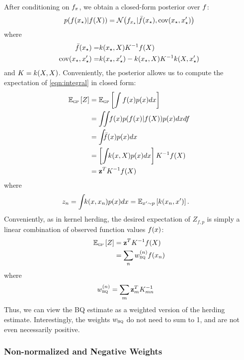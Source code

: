 \documentclass[]{article}
\begin{document}
After conditioning on ${f}_{{x}}$, we obtain a closed-form posterior over ${f}$:
%
\begin{align}
p({f}({x}_\star)|{f}({X})) = \mathcal{N}\!\left({f}_{{x}_\star}|\bar{{f}}({x}_\star),\operatorname{cov}({x}_\star,{x}_\star')\right)
\end{align} 
where
\begin{align}
\bar{{f}}({x}_\star) = & k({x}_\star, {X}) K^{-1} {f}({X}) \\
\operatorname{cov}({x}_\star, {x}_\star') = & k({x}_\star,{x}'_\star) - k({x}_\star, {X}) K^{-1} k({X}, {x}'_\star)
\end{align} 
%
and $K = k({X}, {X})$. 
%
Conveniently, the \gp{} posterior allows us to compute the expectation of \eqref{eqn:integral} in closed form: 
%
\begin{align}
\expectargs{\gp}{Z} & = \expectargs{\gp}{\int f(\vx)p(\vx)d\vx}\\
 & = \int\!\!\! \int\!\! f(\vx) p(f(\vx)|\vf(\vX)) p(\vx) d\vx df\\
 & = \int\!\!\! \mf(\vx) p(\vx) d\vx \\
 & = \left[ \int\!\! k(\vx, \vX) p(\vx) d\vx \right] K^{-1} \vf(\vX) \\
 & = \vz^T K^{-1} \vf(\vX)
\label{eq:marg_mean_symbolic}
\end{align} 
where
\begin{align}
z_n & = \int\!\! k({x}, {x}_n) p({x}) d{x} = \mathbb{E}_{{x}' \sim p} \left[ {k({x}_n, {x}')} \right].
\end{align}
%
Conveniently, as in kernel herding, the desired expectation of $Z_{f,p}$ is simply a linear combination of observed function values ${f}({x})$:
%
\begin{align}
\mathbb{E}_{{\textsc{gp}}} \left[ {Z} \right] & = {\bf{z}}^T K^{-1} {f}({X}) \\
    & = \sum_n w_{{\textsc{bq}}}^{(n)} {f}({x}_n)
\end{align}  
where
\begin{align}  
w_{{\textsc{bq}}}^{(n)} & = \sum_m {\bf{z}}_m^T K^{-1}_{mn}
\label{eq:bq_weights}
\end{align}
%
Thus, we can view the BQ estimate as a weighted version of the herding estimate.  Interestingly, the weights ${w}_{{\textsc{bq}}}$ do not need to sum to 1, and are not even necessarily positive.

\subsubsection{Non-normalized and Negative Weights}
\end{document}
